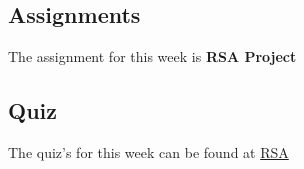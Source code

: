 \subsection{Assignments}

The assignment for this week is \textbf{RSA Project}  

\subsection{Quiz}

The quiz's for this week can be found at \href{https://applied.cs.colorado.edu/mod/quiz/view.php?id=51738}{RSA}  


